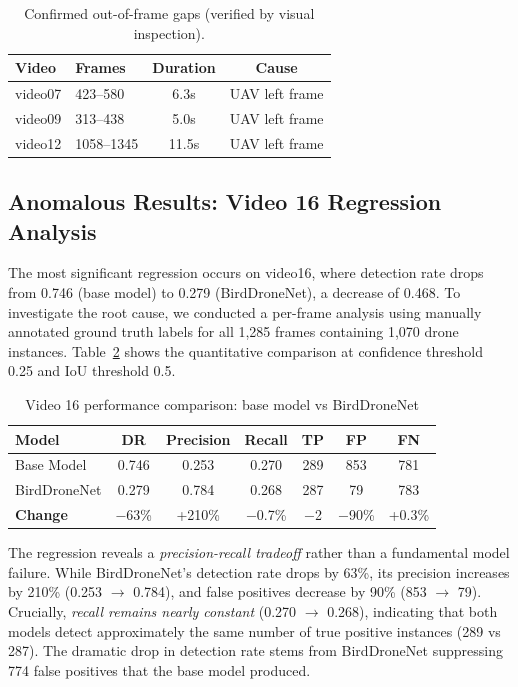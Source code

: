 \documentclass[12pt,a4paper]{report}
\renewcommand{\arraystretch}{1.1}
\begin{document}
\begin{table}[H]
\centering
\caption[Out-of-frame gaps]{Confirmed out-of-frame gaps (verified by visual inspection).}
\label{tab:oof}
\small
\renewcommand{\arraystretch}{0.9}
\begin{tabular}{|l|l|c|c|}
\hline
\rowcolor{gray!20}
\textbf{Video} & \textbf{Frames} & \textbf{Duration} & \textbf{Cause} \\
\hline
video07 & 423--580  & 6.3s  & UAV left frame \\
\hline
video09 & 313--438  & 5.0s  & UAV left frame \\
\hline
video12 & 1058--1345 & 11.5s & UAV left frame \\
\hline
\end{tabular}
\end{table}

\subsection{Anomalous Results: Video 16 Regression Analysis}
\label{sec:anomalous_results}

The most significant regression occurs on video16, where detection rate drops
from 0.746 (base model) to 0.279 (BirdDroneNet), a decrease of 0.468. To
investigate the root cause, we conducted a per-frame analysis using manually
annotated ground truth labels for all 1,285 frames containing 1,070 drone
instances. Table~\ref{tab:video16_regression} shows the quantitative comparison
at confidence threshold 0.25 and IoU threshold 0.5.

\begin{table}[H]
\centering
\caption{Video 16 performance comparison: base model vs BirdDroneNet}
\label{tab:video16_regression}
\begin{tabular}{lcccccc}
\toprule
\textbf{Model} & \textbf{DR} & \textbf{Precision} & \textbf{Recall} & \textbf{TP} & \textbf{FP} & \textbf{FN} \\
\midrule
Base Model      & 0.746 & 0.253 & 0.270 & 289 & 853 & 781 \\
BirdDroneNet    & 0.279 & 0.784 & 0.268 & 287 & 79  & 783 \\
\midrule
\textbf{Change} & $-$63\% & +210\% & $-$0.7\% & $-$2 & $-$90\% & +0.3\% \\
\bottomrule
\end{tabular}
\end{table}

The regression reveals a \textit{precision-recall tradeoff} rather than a
fundamental model failure. While BirdDroneNet's detection rate drops by 63\%,
its precision increases by 210\% (0.253 $\to$ 0.784), and false positives
decrease by 90\% (853 $\to$ 79). Crucially, \textit{recall remains nearly
constant} (0.270 $\to$ 0.268), indicating that both models detect approximately
the same number of true positive instances (289 vs 287). The dramatic drop in
detection rate stems from BirdDroneNet suppressing 774 false positives that
the base model produced.
\end{document}
